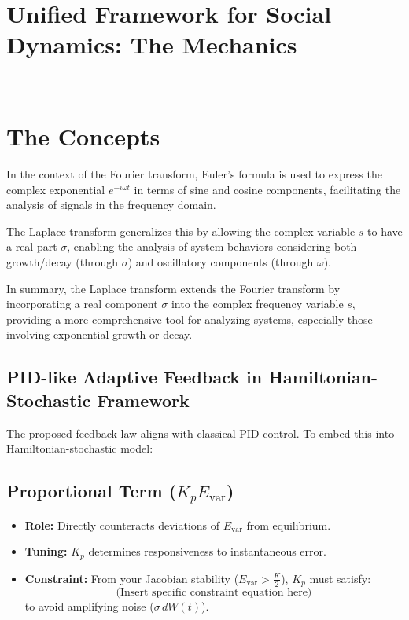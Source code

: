 \documentclass{article}
\theoremstyle{definition}
\begin{document}
\section*{\centering \textbf{Unified Framework for Social Dynamics: The Mechanics}}
\\

\section{The Concepts}

In the context of the Fourier transform, Euler's formula is used to express the complex exponential $e^{-i\omega t}$ in terms of sine and cosine components, facilitating the analysis of signals in the frequency domain.

The Laplace transform generalizes this by allowing the complex variable $s$ to have a real part $\sigma$, enabling the analysis of system behaviors considering both growth/decay (through $\sigma$) and oscillatory components (through $\omega$).

In summary, the Laplace transform extends the Fourier transform by incorporating a real component $\sigma$ into the complex frequency variable $s$, providing a more comprehensive tool for analyzing systems, especially those involving exponential growth or decay.

\subsection{PID-like Adaptive Feedback in Hamiltonian-Stochastic Framework}

The proposed feedback law aligns with classical PID control. To embed this into Hamiltonian-stochastic model:

\subsection{Proportional Term ($K_p E_{\text{var}}$)}
\begin{itemize}
    \item \textbf{Role:} Directly counteracts deviations of $E_{\text{var}}$ from equilibrium.
    \item \textbf{Tuning:} $K_p$ determines responsiveness to instantaneous error.
    \item \textbf{Constraint:} From your Jacobian stability ($E_{\text{var}} > \frac{K}{2}$), $K_p$ must satisfy:
    \[
    \text{(Insert specific constraint equation here)}
    \]
    to avoid amplifying noise ($\sigma\, dW(t)$).
\end{itemize}
\end{document}
